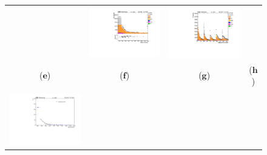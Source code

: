\begin{figure}[htp]
\begin{tabular}{cccc}
& \hspace{-1.0cm} \includegraphics[scale=0.22]{fig/chapt7/qcd/qcd_e_ch/Mass_H_binned_all.pdf}
& \hspace{-1.0cm} \includegraphics[scale=0.225]{fig/chapt7/qcd/qcd_e_ch/massH_cos_theta_all.pdf}\\
($\mathbf{e}$)\qquad\qquad&($\mathbf{f}$)\qquad\qquad&($\mathbf{g}$)\qquad\qquad&($\mathbf{h}$)\qquad\qquad\\
\\
\hspace{-0.5cm}
\includegraphics[scale=0.22]{fig/chapt7/qcd/qcd_mu_ch/ttbar_m_data_drivenQCD.pdf}

\end{tabular}
\end{figure}

